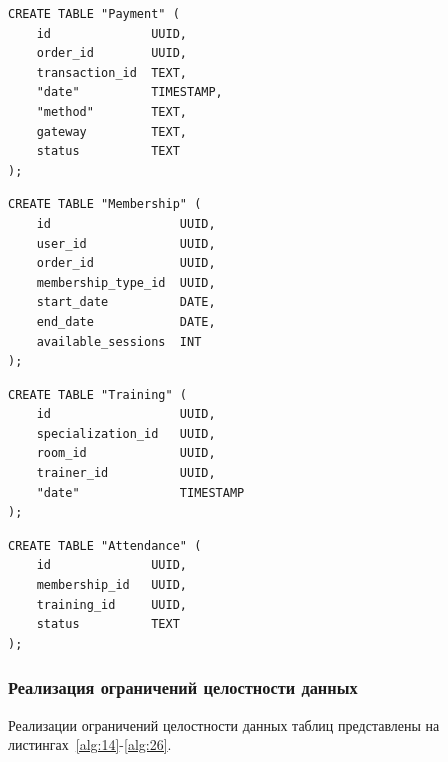 \begin{lstlisting}[label=alg:9, caption=Реализация создания отношения Payment, captionpos=t]
CREATE TABLE "Payment" (
	id				UUID,
	order_id		UUID,
	transaction_id 	TEXT,
	"date" 			TIMESTAMP,
	"method" 		TEXT,
	gateway 		TEXT,
	status 			TEXT
);
\end{lstlisting}

\begin{lstlisting}[label=alg:10, caption=Реализация создания отношенияMembership, captionpos=t]
CREATE TABLE "Membership" (
	id 					UUID,
	user_id				UUID,
	order_id			UUID,
	membership_type_id	UUID,
	start_date			DATE,
	end_date			DATE,
	available_sessions	INT
);
\end{lstlisting}

\begin{lstlisting}[label=alg:11, caption=Реализация создания отношения Training, captionpos=t]
CREATE TABLE "Training" (
	id 					UUID,
	specialization_id	UUID,
	room_id				UUID,
	trainer_id			UUID,
	"date"				TIMESTAMP
);
\end{lstlisting}

\begin{lstlisting}[label=alg:12, caption=Реализация создания отношения Attendance, captionpos=t]
	CREATE TABLE "Attendance" (
	id 				UUID,
	membership_id	UUID,
	training_id		UUID,
	status			TEXT
);
\end{lstlisting}


\subsubsection*{Реализация ограничений целостности данных}

Реализации ограничений целостности данных таблиц представлены на листингах~\ref{alg:14}-\ref{alg:26}.


